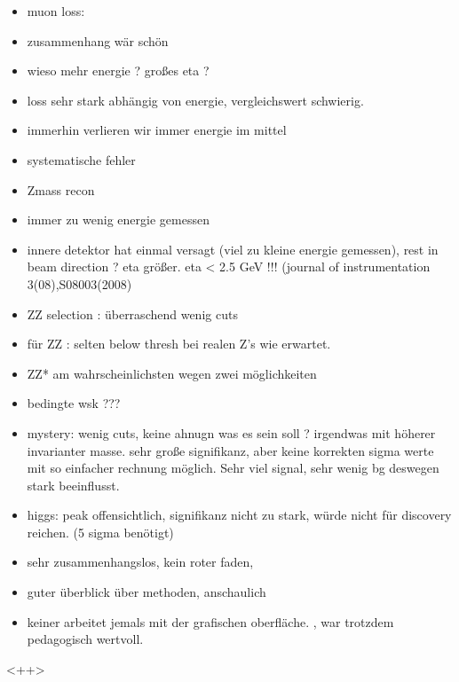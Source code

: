\documentclass[twoside,        %
               BCOR12mm,       %
               ngerman,english, %
               fleqn,headsepline=false,footsepline=false
              ]{Vorlage/MFPREPORT}
\begin{document}
\begin{itemize}
    \item muon loss:
    \item zusammenhang wär schön
    \item wieso mehr energie ? großes eta ?
    \item loss sehr stark abhängig von energie, vergleichswert schwierig.
    \item immerhin verlieren wir immer energie im mittel
    \item systematische fehler

    \item Zmass recon

    \item immer zu wenig energie gemessen
    \item innere detektor hat einmal versagt (viel  zu kleine energie
        gemessen), rest in beam direction ? eta größer. eta < 2.5 GeV !!!
            (journal of instrumentation 3(08),S08003(2008)

    \item ZZ selection : überraschend wenig cuts

    \item für ZZ : selten below thresh bei realen Z's wie erwartet.
    \item ZZ* am wahrscheinlichsten wegen zwei möglichkeiten
    \item bedingte wsk ???

    \item mystery: wenig cuts, keine ahnugn was es sein soll ? irgendwas mit
        höherer invarianter masse. sehr große signifikanz, aber keine korrekten
        sigma werte mit so einfacher rechnung möglich. Sehr viel signal, sehr
        wenig bg deswegen stark beeinflusst.
    \item higgs: peak offensichtlich,  signifikanz nicht zu stark, würde nicht
        für discovery reichen. (5 sigma benötigt)

    \item sehr zusammenhangslos, kein roter faden,
    \item guter überblick über methoden, anschaulich
    \item keiner arbeitet jemals mit der grafischen oberfläche. , war trotzdem
        pedagogisch wertvoll.




\end{itemize}<++>
\end{document}

